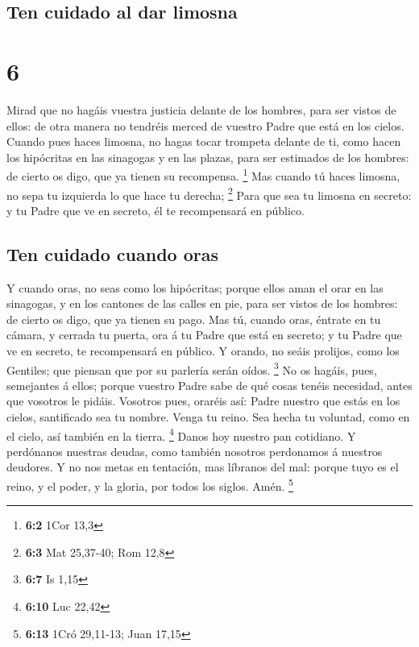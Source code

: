 \hypertarget{ten-cuidado-al-dar-limosna}{%
\subsection{Ten cuidado al dar
limosna}\label{ten-cuidado-al-dar-limosna}}

\hypertarget{section-5}{%
\section{6}\label{section-5}}

 Mirad que no hagáis vuestra justicia delante de los
hombres, para ser vistos de ellos: de otra manera no tendréis merced de
vuestro Padre que está en los cielos.  Cuando pues haces
limosna, no hagas tocar trompeta delante de ti, como hacen los
hipócritas en las sinagogas y en las plazas, para ser estimados de los
hombres: de cierto os digo, que ya tienen su recompensa. \footnote{\textbf{6:2}
  1Cor 13,3}  Mas cuando tú haces limosna, no sepa tu
izquierda lo que hace tu derecha; \footnote{\textbf{6:3} Mat 25,37-40;
  Rom 12,8}  Para que sea tu limosna en secreto: y tu Padre
que ve en secreto, él te recompensará en público.

\hypertarget{ten-cuidado-cuando-oras}{%
\subsection{Ten cuidado cuando oras}\label{ten-cuidado-cuando-oras}}

 Y cuando oras, no seas como los hipócritas; porque ellos
aman el orar en las sinagogas, y en los cantones de las calles en pie,
para ser vistos de los hombres: de cierto os digo, que ya tienen su
pago.  Mas tú, cuando oras, éntrate en tu cámara, y cerrada
tu puerta, ora á tu Padre que está en secreto; y tu Padre que ve en
secreto, te recompensará en público.  Y orando, no seáis
prolijos, como los Gentiles; que piensan que por su parlería serán
oídos. \footnote{\textbf{6:7} Is 1,15}  No os hagáis, pues,
semejantes á ellos; porque vuestro Padre sabe de qué cosas tenéis
necesidad, antes que vosotros le pidáis.  Vosotros pues,
oraréis así: Padre nuestro que estás en los cielos, santificado sea tu
nombre.  Venga tu reino. Sea hecha tu voluntad, como en el
cielo, así también en la tierra. \footnote{\textbf{6:10} Luc 22,42}
 Danos hoy nuestro pan cotidiano.  Y
perdónanos nuestras deudas, como también nosotros perdonamos á nuestros
deudores.  Y no nos metas en tentación, mas líbranos del
mal: porque tuyo es el reino, y el poder, y la gloria, por todos los
siglos. Amén. \footnote{\textbf{6:13} 1Cró 29,11-13; Juan 17,15}

